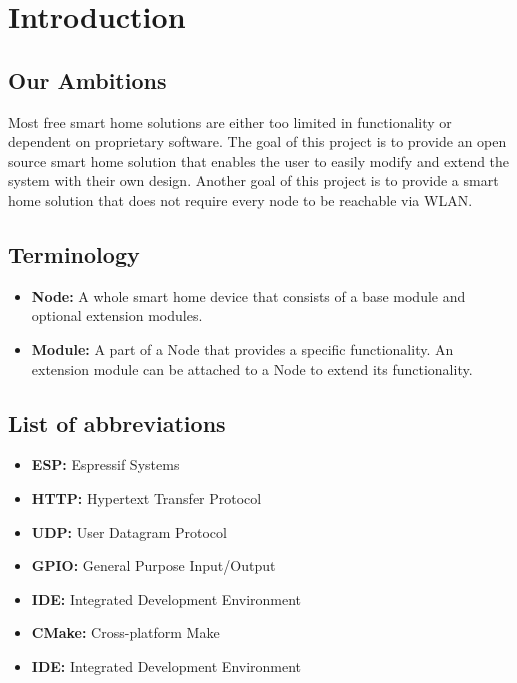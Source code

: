 \chapter{Introduction}
\renewcommand*\chapterpagestyle{scrheadings}

    \section{Our Ambitions}
        Most free smart home solutions are either too limited in
        functionality or dependent on proprietary software.
        The goal of this project is to provide an open source
        smart home solution that enables the user to easily modify 
        and extend the system with their own design. Another goal of
        this project is to provide a smart home solution that does
        not require every node to be reachable via WLAN.

    \section{Terminology}
        \begin{itemize}
            \item \textbf{Node:} A whole smart home device that
            consists of a base module and optional extension modules.

            \item \textbf{Module:} A part of a Node that provides
            a specific functionality. An extension module can be
            attached to a Node to extend its functionality.

        \end{itemize}

    \section{List of abbreviations}
        \begin{itemize}
            \item \textbf{ESP:} Espressif Systems
            \item \textbf{HTTP:} Hypertext Transfer Protocol
            \item \textbf{UDP:} User Datagram Protocol
            \item \textbf{GPIO:} General Purpose Input/Output
            \item \textbf{IDE:} Integrated Development Environment
            \item \textbf{CMake:} Cross-platform Make
            \item \textbf{IDE:} Integrated Development Environment
        \end{itemize}


    